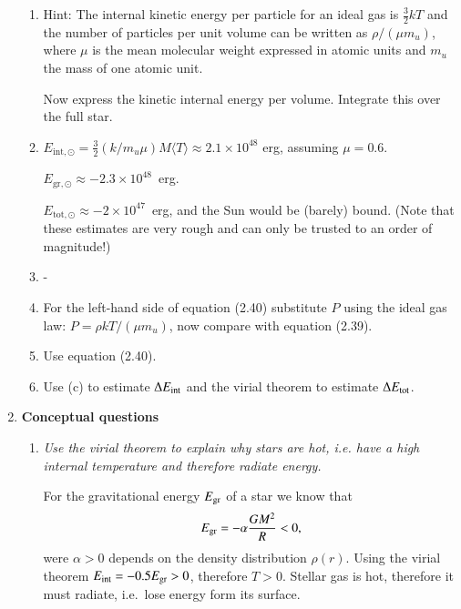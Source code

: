 \documentclass[11pt,a4paper]{report}
\begin{document}
\begin{enumerate}
\begin{enumerate}
  \item Hint: The internal kinetic energy per particle for an ideal
    gas is $\frac{3}{2}kT$ and the number of particles per unit volume
    can be written as $\rho/(\mu m_u)$, where $\mu$ is the mean
    molecular weight expressed in atomic units and $m_u$ the mass of
    one atomic unit.
    
    Now express the kinetic internal energy per volume. Integrate this
    over the full star.
    
  
  \item $E_{\mathrm{int},\odot} = \frac{3}{2} (k / m_u \mu) M \langle T
    \rangle \approx 2.1\times10^{48}$ erg, assuming $\mu = 0.6$. 

    $E_{\mathrm{gr},\odot} \approx -2.3 \times 10^{48}$~erg.

    $E_{\mathrm{tot},\odot} \approx -2\times 10^{47}$~erg, and the Sun would be
    (barely) bound. (Note that these estimates are very rough and can
    only be trusted to an order of magnitude!)
    
  \item -
    
  \item For the left-hand side of equation (2.40) substitute $P$ using the
  ideal gas law: $P = \rho k T / (\mu m_u) $, now compare with
  equation (2.39). 
  
  \item Use equation (2.40).
    
  \item Use (c) to estimate $\Delta E_{\rm int}$ and the virial theorem
  to estimate $\Delta E_{\rm tot}$.

 

      

  \end{enumerate}
  
\item {\bf Conceptual questions}
  \begin{enumerate}
  \item {\it Use the virial theorem to explain why stars are hot,
    i.e. have a high internal temperature and therefore radiate energy.}
    
    For the gravitational energy $E_{\rm gr}$ of a star we know that 
    \begin{equation}
      E_{\rm gr} = -\alpha\frac{G M^2}{R} < 0,
    \end{equation}
    were $\alpha>0$ depends on the density distribution $\rho(r)$. Using
    the virial theorem $E_{\rm int} = -0.5 E_{\rm gr} > 0$, therefore
    $T>0$. Stellar gas is hot, therefore it must radiate, i.e.\ lose
    energy form its surface.


\end{enumerate}
\end{enumerate}
\end{document}
